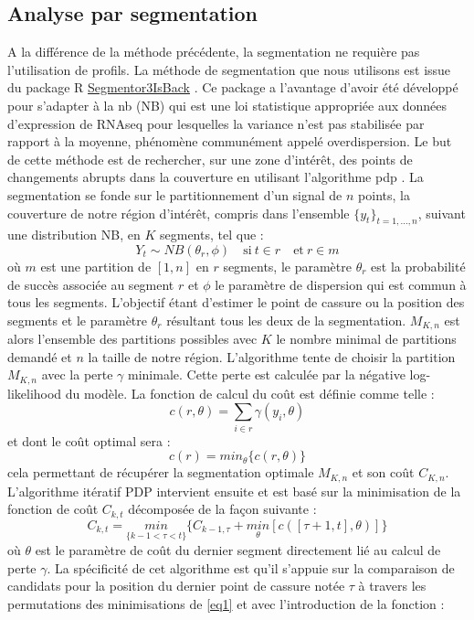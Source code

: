 \documentclass[12pt,a4paper]{report}
\begin{document}
\begin{onehalfspace}
\subsection*{Analyse par segmentation}
A la différence de la méthode précédente, la segmentation ne requière pas l'utilisation de profils. La méthode de segmentation que nous utilisons est issue du package R \href{http://cran.r-project.org/web/packages/Segmentor3IsBack/index.html}{Segmentor3IsBack} \citep{Cleynen2014}. Ce package a l'avantage d'avoir été développé pour s'adapter à la \gls{nb} (NB) qui est une loi statistique appropriée aux données d'expression de RNAseq pour lesquelles la variance n'est pas stabilisée par rapport à la moyenne, phénomène communément appelé overdispersion. Le but de cette méthode est de rechercher, sur une zone d'intérêt, des points de changements abrupts dans la couverture en utilisant l'algorithme \gls{pdp} \citep{Rigaill2010}. La segmentation se fonde sur le partitionnement d'un signal de $n$ points, la couverture de notre région d'intérêt, compris dans l'ensemble ${\{y_t\}_{t=1,\ldots,n}}$, suivant une distribution NB, en $K$ segments, tel que :
\[ Y_t \sim NB(\theta_r,\phi) \quad \text{si}\ t \in r \quad \text{et}\ r \in m \]
où $m$ est une partition de $[1,n]$ en $r$ segments, le paramètre $\theta_r$ est la probabilité de succès associée au segment $r$ et $\phi$ le paramètre de dispersion qui est commun à tous les segments. L'objectif étant d'estimer le point de cassure ou la position des segments et le paramètre $\theta_r$ résultant tous les deux de la segmentation. $M_{K,n}$ est alors l'ensemble des partitions possibles avec $K$ le nombre minimal de partitions demandé et $n$ la taille de notre région. L'algorithme tente de choisir la partition $M_{K,n}$ avec la perte $\gamma$ minimale. Cette perte est calculée par la négative log-likelihood du modèle. La fonction de calcul du coût est définie comme telle :
\[ c(r,\theta) = \sum_{i \in r} \gamma(y_i,\theta) \]
et dont le coût optimal sera :
\[ c(r) = min_\theta\{c(r,\theta)\} \]
cela permettant de récupérer la segmentation optimale $M_{K,n}$ et son coût $C_{K,n}$. L'algorithme itératif PDP intervient ensuite et est basé sur la minimisation de la fonction de coût $C_{k,t}$ décomposée de la façon suivante :
\begin{equation}
\label{eq1}
C_{k,t} = \underset{\{k-1<\tau<t\}}{min} \{C_{k-1,\tau} + \underset{\theta}{min}[c([\tau + 1,t],\theta)]\}
\end{equation}
où $\theta$ est le paramètre de coût du dernier segment directement lié au calcul de perte $\gamma$. La spécificité de cet algorithme est qu'il s'appuie sur la comparaison de candidats pour la position du dernier point de cassure notée $\tau$ à travers les permutations des minimisations de \eqref{eq1} et avec l'introduction de la fonction :

\end{onehalfspace}
\end{document}

